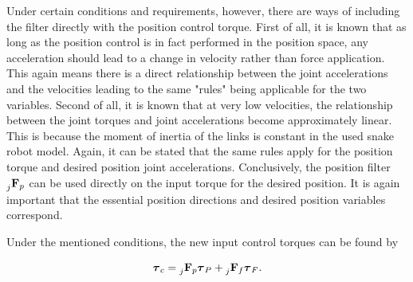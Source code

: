 Under certain conditions and requirements, however, there are ways of including the filter directly with the position control torque. First of all, it is known that as long as the position control is in fact performed in the position space, any acceleration should lead to a change in velocity rather than force application. This again means there is a direct relationship between the joint accelerations and the velocities leading to the same "rules" being applicable for the two variables. Second of all, it is known that at very low velocities, the relationship between the joint torques and joint accelerations become approximately linear. This is because the moment of inertia of the links is constant in the used snake robot model. Again, it can be stated that the same rules apply for the position torque and desired position joint accelerations. Conclusively, the position filter $\prescript{}{j}{\mathbf{F}}_{p}$ can be used directly on the input torque for the desired position. It is again important that the essential position directions and desired position variables correspond.

Under the mentioned conditions, the new input control torques can be found by

\begin{equation}
    \boldsymbol{\tau}_c = \prescript{}{j}{\mathbf{F}}_{p} \boldsymbol{\tau}_P + \prescript{}{j}{\mathbf{F}}_{f} \boldsymbol{\tau}_F.
\end{equation}
\\
